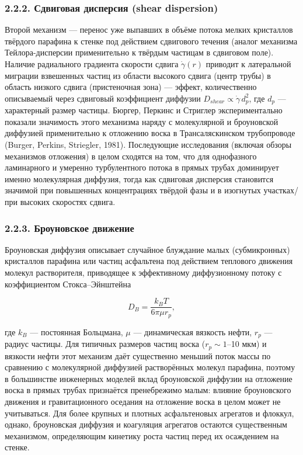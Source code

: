 \documentclass[11pt]{extarticle}
\begin{document}
\subsubsection{2.2.2. Сдвиговая дисперсия (shear dispersion)}\label{ux441ux434ux432ux438ux433ux43eux432ux430ux44f-ux434ux438ux441ux43fux435ux440ux441ux438ux44f-shear-dispersion}

Второй механизм --- перенос уже выпавших в объёме потока мелких кристаллов твёрдого парафина к стенке под действием сдвигового течения (аналог механизма Тейлора-дисперсии применительно к твёрдым частицам в сдвиговом поле). Наличие радиального градиента скорости сдвига \(\dot\gamma(r)\) приводит к латеральной миграции взвешенных частиц из области высокого сдвига (центр трубы) в область низкого сдвига (пристеночная зона) --- эффект, количественно описываемый через сдвиговый коэффициент диффузии \(D_{shear} \propto \dot\gamma\, d_p^2\), где \(d_p\) --- характерный размер частицы. Бюргер, Перкинс и Стриглер экспериментально показали значимость этого механизма наряду с молекулярной и броуновской диффузией применительно к отложению воска в Трансаляскинском трубопроводе (Burger, Perkins, Striegler, 1981). Последующие исследования (включая обзоры механизмов отложения) в целом сходятся на том, что для однофазного ламинарного и умеренно турбулентного потока в прямых трубах доминирует именно молекулярная диффузия, тогда как сдвиговая дисперсия становится значимой при повышенных концентрациях твёрдой фазы и в изогнутых участках/при высоких скоростях сдвига.

\subsubsection{2.2.3. Броуновское движение}\label{ux431ux440ux43eux443ux43dux43eux432ux441ux43aux43eux435-ux434ux432ux438ux436ux435ux43dux438ux435}

Броуновская диффузия описывает случайное блуждание малых (субмикронных) кристаллов парафина или частиц асфальтена под действием теплового движения молекул растворителя, приводящее к эффективному диффузионному потоку с коэффициентом Стокса--Эйнштейна

\[
D_B = \frac{k_B T}{6\pi \mu r_p},
\]

где \(k_B\) --- постоянная Больцмана, \(\mu\) --- динамическая вязкость нефти, \(r_p\) --- радиус частицы. Для типичных размеров частиц воска (\(r_p \sim 1\)--10 мкм) и вязкости нефти этот механизм даёт существенно меньший поток массы по сравнению с молекулярной диффузией растворённых молекул парафина, поэтому в большинстве инженерных моделей вклад броуновской диффузии на отложение воска в прямых трубах признаётся пренебрежимо малым: влияние броуновского движения и гравитационного оседания на отложение воска в целом может не учитываться. Для более крупных и плотных асфальтеновых агрегатов и флоккул, однако, броуновская диффузия и коагуляция агрегатов остаются существенным механизмом, определяющим кинетику роста частиц перед их осаждением на стенке.
\end{document}
